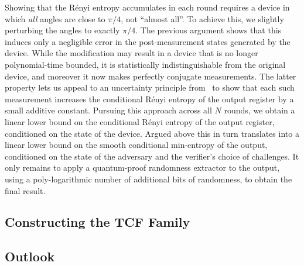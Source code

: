 \documentclass[11pt]{article}
\theoremstyle{remark}
\theoremstyle{definition}
\begin{document}
Showing that the R\'enyi entropy accumulates in each round requires a device in which \emph{all} angles are close to $\pi/4$, not ``almost all''. To achieve this, we slightly perturbing the angles to 
exactly $\pi/4$. The previous argument shows that this induces only a negligible error in the post-measurement states generated by the device. While the modification may result in a device that is no longer polynomial-time bounded, it is statistically indistinguishable from the original device, and moreover it now makes perfectly conjugate measurements. The latter property lets us appeal to
an uncertainty principle from~\cite{miller2014universal} to show that each such measurement increases the conditional R\'enyi entropy of the output register by a small additive constant. Pursuing this approach across all $N$ rounds, we obtain a linear lower bound on the conditional R\'enyi entropy of the output register, conditioned on the  state of the device. Argued above this in turn translates into a linear lower bound on the smooth conditional min-entropy of the output, conditioned on the state of the adversary and the verifier's choice of challenges. It only remains to apply a quantum-proof randomness extractor to the output, using a poly-logarithmic number of additional bits of randomness, to obtain the final result. 


\subsection{Constructing the TCF Family}


\subsection{Outlook}
\end{document}
